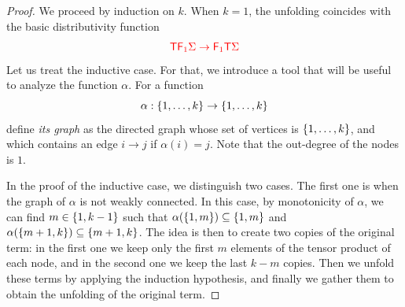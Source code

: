 \begin{proof}
We proceed by induction on $k$. When $k=1$, the unfolding coincides with the basic distributivity function 
\begin{align*}
{\color{red}{ {\color{red}{\mathsf T}}{\color{red}{\mathsf F_{1}}}\Sigma \to {{\color{red}{\mathsf F_{1}}}{\color{red}{\mathsf T}}\Sigma}}}
\end{align*}
Let us treat the inductive case. For that, we introduce a tool that will be useful to analyze the function $\alpha$. For a function $$\alpha: \{1,\ldots,k\} \to \{1,\ldots,k\}$$ define  \emph{its graph} as the directed graph whose set of vertices is $\{1,\ldots,k\}$, and which contains an edge $i\rightarrow j$ if $\alpha(i)=j$. Note that the out-degree of the nodes is $1.$

\medskip
In the proof of the inductive case, we distinguish two cases. The first one is when the graph of $\alpha$ is not weakly connected. In this case, by monotonicity of $\alpha$, we can find $m\in \{1,k-1\}$ such that $\alpha(\{1,m\})\subseteq\{1,m\}$ and $\alpha(\{m+1,k\})\subseteq\{m+1,k\}$. The idea is then to create two copies of the original term: in the first one we keep only the first $m$ elements of the tensor product of each node, and in the second one we keep the last $k-m$ copies. Then we unfold these terms by applying the induction hypothesis, and  finally we gather them to obtain the  unfolding of the original term. 


\end{proof}
